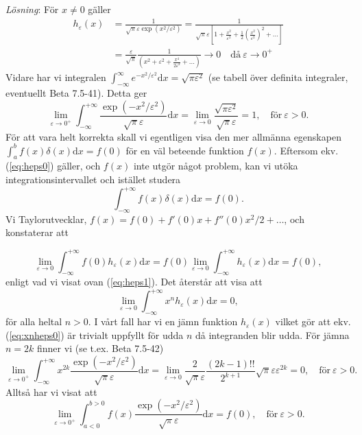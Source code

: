 \documentclass[%
oneside,                 %
final,                   %
10pt]{article}
\begin{document}
\emph{Lösning}:
För $x \neq 0$ gäller
\begin{align}
h_\varepsilon(x) 
&= \frac{1}{\sqrt{\pi} \varepsilon \exp(x^2 / \varepsilon^2)}
= \frac{1}{\sqrt{\pi} \varepsilon \left[ 1 + \frac{x^2}{\varepsilon^2} + \frac{1}{2}\left(\frac{x^2}{\varepsilon^2}\right)^2 + \ldots \right] } \nonumber \\ 
&= \frac{\varepsilon}{\sqrt{\pi}} \frac{1}{\left( x^2 + \varepsilon^2 + \frac{x^4}{2\varepsilon^2} + \ldots \right)} \to 0 \quad \mathrm{då~} \varepsilon \to 0^+
\label{eq:heps0}
\end{align}
Vidare har vi integralen $\int_{-\infty}^\infty e^{-x^2 / \varepsilon^2} \mbox{d}x = \sqrt{\pi \varepsilon^2}$ (se tabell över definita integraler, eventuellt Beta 7.5-41). Detta ger
\begin{equation}
\lim_{\varepsilon \to 0^+}
\int_{-\infty}^{+\infty} \frac{\exp(-x^2 / \varepsilon^2)}{\sqrt{\pi} \varepsilon} \mbox{d}x = \lim_{\varepsilon \to 0} \frac{\sqrt{\pi \varepsilon^2}}{\sqrt{\pi} \varepsilon} = 1, \quad \mathrm{för~} \varepsilon>0.
\label{eq:heps1}
\end{equation}
För att vara helt korrekta skall vi egentligen visa den mer allmänna egenskapen $\int_a^b f(x) \delta(x) \mbox{d}x = f(0)$ för en väl beteende funktion $f(x)$. Eftersom ekv. (\ref{eq:heps0}) gäller, och $f(x)$ inte utgör något problem, kan vi utöka integrationsintervallet och istället studera
\begin{equation}
\int_{-\infty}^{+\infty} f(x) \delta(x) \mbox{d}x = f(0).
\end{equation}
Vi Taylorutvecklar, $f(x) = f(0) + f'(0)x + f''(0)x^2/2+\ldots$, och konstaterar att 

\begin{equation}
\lim_{\varepsilon \to 0} \int_{-\infty}^{+\infty} f(0) h_\varepsilon(x) \mbox{d}x = f(0) \lim_{\varepsilon \to 0} \int_{-\infty}^{+\infty} h_\varepsilon(x) \mbox{d}x = f(0),
\end{equation}
enligt vad vi visat ovan (\ref{eq:heps1}). Det återstår att visa att 
\begin{equation}
\lim_{\varepsilon \to 0} \int_{-\infty}^{+\infty} x^n h_\varepsilon(x) \mbox{d}x = 0,
\label{eq:xnheps0}
\end{equation}
för alla heltal $n>0$. I vårt fall har vi en jämn funktion $h_\varepsilon(x)$ vilket gör att ekv. (\ref{eq:xnheps0}) är trivialt uppfyllt för udda $n$ då integranden blir udda. För jämna $n=2k$ finner vi (se t.ex. Beta 7.5-42) 
\begin{equation}
\lim_{\varepsilon \to 0^+}
\int_{-\infty}^{+\infty} x^{2k} \frac{\exp(-x^2 / \varepsilon^2)}{\sqrt{\pi} \varepsilon} \mbox{d}x = \lim_{\varepsilon \to 0} \frac{2}{\sqrt{\pi} \varepsilon} \frac{(2k-1)!!}{2^{k+1}} \sqrt{\pi} \varepsilon \varepsilon^{2k} = 0, \quad \mathrm{för~} \varepsilon>0.
\end{equation}
Alltså har vi visat att
\begin{equation}
\lim_{\varepsilon \to 0^+}
\int_{a<0}^{b>0} f(x) \frac{\exp(-x^2 / \varepsilon^2)}{\sqrt{\pi} \varepsilon} \mbox{d}x = f(0), \quad \mathrm{för~} \varepsilon>0.
\end{equation}
\end{document}
